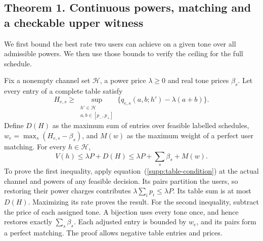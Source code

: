 \subsection{Theorem 1. Continuous powers, matching and a checkable upper witness}
We first bound the best rate two users can achieve on a given tone over all admissible powers. We then use those bounds to verify the ceiling for the full schedule. 

Fix a nonempty channel set $\mathcal H$, a power price $\lambda\ge0$ and real tone prices $\beta_s$. Let every entry of a complete table satisfy
\begin{equation}
 H_{e,s}\ge\sup_{\substack{h'\in\mathcal H\\a,b\in[p_-,p_+]}}
          \{q_{e,s}(a,b;h')-\lambda(a+b)\}.
 \label{supp:table-condition}
\end{equation}
Define $D(H)$ as the maximum sum of entries over feasible labelled schedules,
$w_e=\max_s(H_{e,s}-\beta_s)$, and $M(w)$ as the maximum weight of a perfect user matching. For every $h\in\mathcal H$,
\begin{equation}
 V(h)\le\lambda P+D(H)
       \le\lambda P+\sum_s\beta_s+M(w).
 \label{supp:theorem1}
\end{equation}
To prove the first inequality, apply equation~(\ref{supp:table-condition}) at the actual channel and powers of any feasible decision. Its pairs partition the users, so restoring their power charges contributes $\lambda\sum_i p_i\le\lambda P$. Its table sum is at most $D(H)$. Maximizing its rate proves the result. For the second inequality, subtract the price of each assigned tone. A bijection uses every tone once, and hence restores exactly $\sum_s\beta_s$. Each adjusted entry is bounded by $w_e$, and its pairs form a perfect matching. The proof allows negative table entries and prices.

